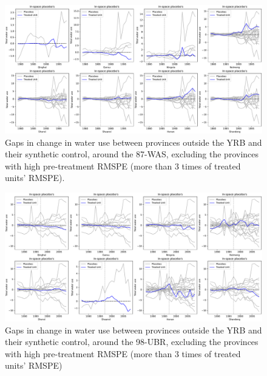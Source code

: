 \begin{figure}
    \includegraphics[width=0.9\linewidth]{img/ch5/87placebo.pdf}
    \centering
    \caption{Gaps in change in water use between provinces outside the YRB and their synthetic control, around the 87-WAS, excluding the provinces with high pre-treatment RMSPE (more than $3$ times of treated units' RMSPE).}\label{fig:87placebo}
\end{figure}

\begin{figure}
    \includegraphics[width=0.9\linewidth]{img/ch5/98placebo.pdf}
    \centering
    \caption{Gaps in change in water use between provinces outside the YRB and their synthetic control, around the 98-UBR, excluding the provinces with high pre-treatment RMSPE (more than $3$ times of treated units' RMSPE)}\label{fig:98placebo}
\end{figure}
